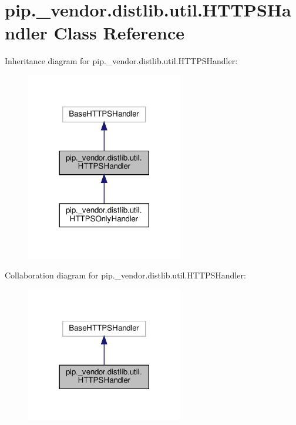 \hypertarget{classpip_1_1__vendor_1_1distlib_1_1util_1_1HTTPSHandler}{}\section{pip.\+\_\+vendor.\+distlib.\+util.\+H\+T\+T\+P\+S\+Handler Class Reference}
\label{classpip_1_1__vendor_1_1distlib_1_1util_1_1HTTPSHandler}


Inheritance diagram for pip.\+\_\+vendor.\+distlib.\+util.\+H\+T\+T\+P\+S\+Handler\+:
\nopagebreak
\begin{figure}[H]
\begin{center}
\leavevmode
\includegraphics[width=194pt]{classpip_1_1__vendor_1_1distlib_1_1util_1_1HTTPSHandler__inherit__graph}
\end{center}
\end{figure}


Collaboration diagram for pip.\+\_\+vendor.\+distlib.\+util.\+H\+T\+T\+P\+S\+Handler\+:
\nopagebreak
\begin{figure}[H]
\begin{center}
\leavevmode
\includegraphics[width=194pt]{classpip_1_1__vendor_1_1distlib_1_1util_1_1HTTPSHandler__coll__graph}
\end{center}
\end{figure}
